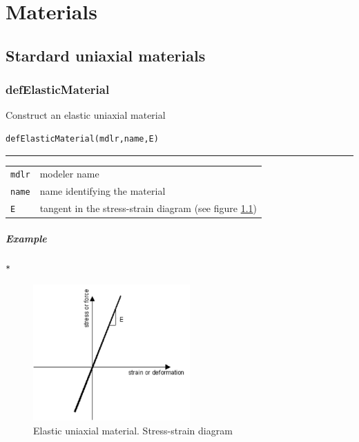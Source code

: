 \chapter{Materials}
\section{Stardard uniaxial materials}
\subsection{defElasticMaterial}
\noindent Construct an elastic uniaxial material
\begin{verbatim}
defElasticMaterial(mdlr,name,E)
\end{verbatim}
\vspace{-10pt}
{\color{grayLines} \rule{\linewidth}{0.25pt}}
\begin{center}
\begin{tabular}{lp{10cm}}
{\tt mdlr} & modeler name \\
{\tt name} & name identifying the material \\
{\tt E} & tangent in the stress-strain diagram (see figure \ref{Elastic}) \\
\end{tabular}
\end{center}
\paragraph{Example}
\begin{verbatim}
*
\end{verbatim}

\begin{figure}[h]
\centering
\includegraphics[width=60mm]{materials/figures/Elastic}
\caption{Elastic uniaxial material. Stress-strain diagram}\label{Elastic}
\end{figure}

